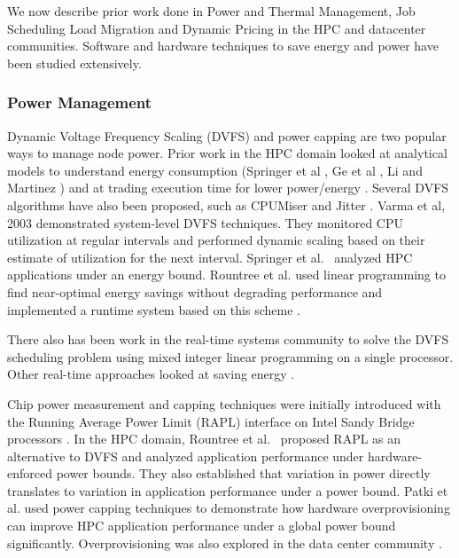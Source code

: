 We now describe prior work done in Power and Thermal Management, Job Scheduling Load 
Migration and Dynamic Pricing in the HPC and datacenter communities. Software and hardware 
techniques to save energy and power have been studied extensively. 

\subsubsection{Power Management}
Dynamic Voltage Frequency Scaling (DVFS) and power capping are two popular ways to manage 
node power. Prior work in the HPC domain looked at analytical models to understand 
energy consumption (Springer et al \cite{SpringerPPoPP2006}, Ge et al \cite{GeICPP2007},
Li and Martinez \cite{LiHPCA2006}) and at trading execution time for lower power/energy \cite{CameronSC2005,HsuSC2005}. Several DVFS algorithms have also been proposed, such as CPUMiser \cite{GeICPP2007} and Jitter \cite{KappiahSC2005}. Varma et al, 2003 \cite{varma_control-theoretic_2003} demonstrated system-level DVFS techniques. They monitored CPU utilization at regular intervals and performed dynamic scaling based on their estimate of utilization for the next interval. Springer et al.~\cite{springer:06} analyzed HPC applications under an energy bound. Rountree et al. used linear programming to find near-optimal energy savings without degrading performance \cite{rountree:07} and implemented a runtime system based on this scheme \cite{rountree:09}. 

There also has been work in the real-time systems community to solve the DVFS scheduling problem using mixed integer linear programming on a single processor\cite{IshiharaISLPED1998,SaputraLCTES2002,SwaminathanRTSS2000,SwaminathanASPDAC2001}. Other real-time approaches looked at saving energy \cite{MoncusiRTSS2003,MochockiICCAD2002,MochockiRTAS2005,ZhuTPDS2003,ZhangDAC2002}. 


Chip power measurement and capping techniques were initially introduced with the Running Average Power Limit (RAPL) interface on Intel Sandy Bridge processors \cite{IntelSDM,David2010}. In the HPC domain, Rountree et al.~\cite{Rountree2012} proposed RAPL as an alternative to DVFS and analyzed application performance under hardware-enforced power bounds. They also established that variation in power directly translates to variation in application performance under a power bound. Patki et al. \cite{Patki1} used power capping techniques to demonstrate how hardware overprovisioning can improve HPC application performance under a global power bound significantly. Overprovisioning was also explored in the data center community \cite{femal:04}. 

